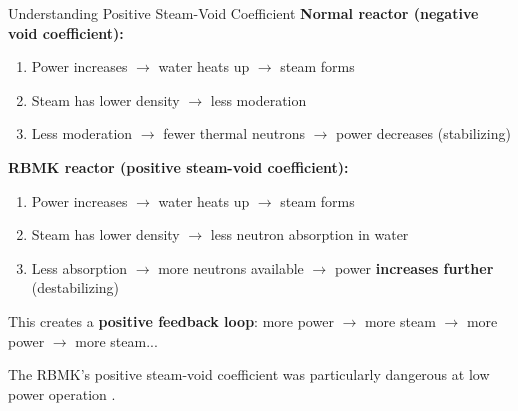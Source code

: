 \documentclass[aspectratio=169]{beamer}
\begin{document}
\begin{frame}[allowframebreaks]{Understanding Positive Steam-Void Coefficient}
    \textbf{Normal reactor (negative void coefficient):}
    \begin{enumerate}
        \item Power increases $\rightarrow$ water heats up $\rightarrow$ steam forms
        \item Steam has lower density $\rightarrow$ less moderation
        \item Less moderation $\rightarrow$ fewer thermal neutrons $\rightarrow$ power decreases (stabilizing)
    \end{enumerate}

    \vspace{1em}
    \textbf{RBMK reactor (positive steam-void coefficient):}
    \begin{enumerate}
        \item Power increases $\rightarrow$ water heats up $\rightarrow$ steam forms
        \item Steam has lower density $\rightarrow$ less neutron absorption in water
        \item Less absorption $\rightarrow$ more neutrons available $\rightarrow$ power \textbf{increases further} (destabilizing)
    \end{enumerate}

    \vspace{1em}
    This creates a \textbf{positive feedback loop}: more power $\rightarrow$ more steam $\rightarrow$ more power $\rightarrow$ more steam...

    \vspace{1em}
    The RBMK's positive steam-void coefficient was particularly dangerous at low power operation \cite{malko2002chernobyl}.
\end{frame}
\end{document}
